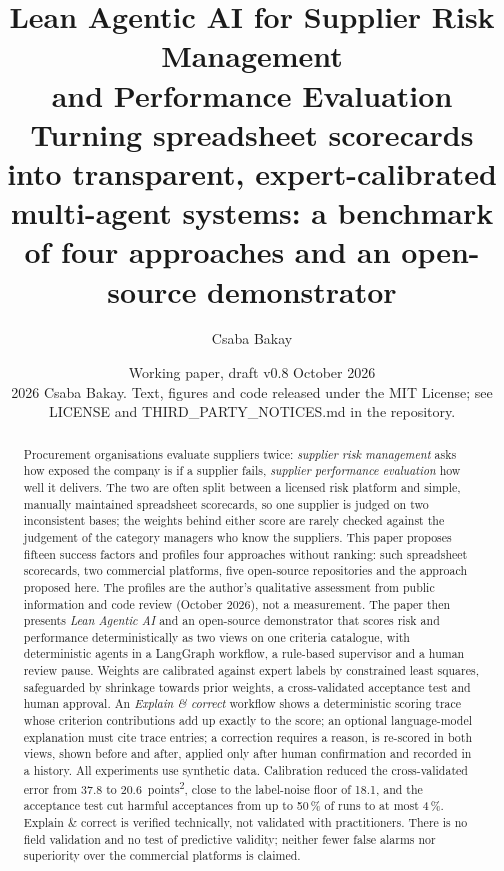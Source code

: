 \documentclass[10pt,twocolumn,a4paper]{article}
\title{\vspace{-1.4em}\Large\bfseries Lean Agentic AI for Supplier Risk Management\\
and Performance Evaluation\\[0.35em]
\large\mdseries Turning spreadsheet scorecards into transparent, expert-calibrated
multi-agent systems: a benchmark of four approaches and an open-source demonstrator}
\author{Csaba Bakay}
\date{Working paper, draft v0.8 \textperiodcentered{} October 2026\\[0.4ex]
  {\footnotesize \textcopyright{} 2026 Csaba Bakay. Text, figures and code released under the MIT License;
  see LICENSE and THIRD\_PARTY\_NOTICES.md in the repository.}}
\newcommand{\ptsq}{points\textsuperscript{2}}
\begin{document}
\maketitle

\begin{abstract}
\noindent
Procurement organisations evaluate suppliers twice: \emph{supplier risk management} asks
how exposed the company is if a supplier fails, \emph{supplier performance evaluation} how
well it delivers. The two are often split between a licensed risk platform and simple,
manually maintained spreadsheet scorecards, so one supplier is judged on two inconsistent
bases; the weights behind either score are rarely checked against the judgement of the
category managers who know the suppliers. This paper proposes fifteen success factors and
profiles four approaches without ranking: such spreadsheet scorecards, two commercial
platforms, five open-source repositories and the approach proposed here. The profiles are
the author's qualitative assessment from public information and code review (October
2026), not a measurement. The paper then presents \emph{Lean Agentic AI} and an
open-source demonstrator that scores risk and performance deterministically as two views
on one criteria catalogue, with deterministic agents in a LangGraph workflow, a rule-based
supervisor and a human review pause. Weights are calibrated against expert labels by
constrained least squares, safeguarded by shrinkage towards prior weights, a
cross-validated acceptance test and human approval. An \emph{Explain \& correct} workflow
shows a deterministic scoring trace whose criterion contributions add up exactly to the
score; an optional language-model explanation must cite trace entries; a correction
requires a reason, is re-scored in both views, shown before and after, applied only after
human confirmation and recorded in a history. All experiments use synthetic data.
Calibration reduced the cross-validated error from 37.8 to 20.6~\ptsq{}, close to the
label-noise floor of 18.1, and the acceptance test cut harmful acceptances from up to
50\,\% of runs to at most 4\,\%. Explain \& correct is verified technically, not validated
with practitioners. There is no field validation and no test of predictive validity;
neither fewer false alarms nor superiority over the commercial platforms is claimed.
\end{abstract}

{\small\tableofcontents}
\vspace{0.6em}

\end{document}
